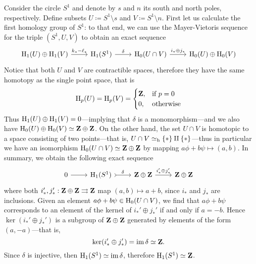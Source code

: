 \begin{example}
    \label{exp:homology-of-the-circle}
    Consider the circle \(S^1\) and denote by \(s\) and \(n\) its south and north
    poles, respectively. Define subsets \(U \coloneq S^1 \setminus s\) and
    \(V \coloneq S^1 \setminus n\). First let us calculate the first homology group of
    \(S^1\): to that end, we can use the Mayer-Vietoris sequence for the triple
    \((S^1, U, V)\) to obtain an exact sequence
    \[
        \begin{tikzcd}
            \Hmlg_1(U) \oplus \Hmlg_1(V) \ar[r, "k_{*} - \ell_{*}"]
            &\Hmlg_1(S^1) \ar[r, "\delta"]
            &\Hmlg_0(U \cap V) \ar[r, "i_{*} \oplus j_{*}"]
            &\Hmlg_0(U) \oplus \Hmlg_0(V)
        \end{tikzcd}
    \]
    Notice that both \(U\) and \(V\) are contractible spaces, therefore they have
    the same homotopy as the single point space, that is
    \[
        \operatorname{H}_p(U) = \operatorname{H}_p(V) =
        \begin{cases}
            \mathbf{Z}, & \text{if } p = 0 \\
            0,  & \text{otherwise}
        \end{cases}
    \]
    Thus \(\operatorname{H}_1(U) \oplus \operatorname{H}_1(V) = 0\)---implying that \(\delta\) is a monomorphism---and
    we also have \(\operatorname{H}_0(U) \oplus \operatorname{H}_0(V) \simeq \mathbf{Z} \oplus \mathbf{Z}\). On the other hand, the
    set \(U \cap V\) is homotopic to a space consisting of two points---that is,
    \(U \cap V \simeq_{\text{h}} \{*\} \amalg \{*\}\)---thus in particular we have an isomorphism
    \(\operatorname{H}_0(U \cap V) \simeq \mathbf{Z} \oplus \mathbf{Z}\) by mapping
    \(a \phi + b \psi \mapsto (a, b)\). In summary, we obtain the following exact
    sequence
    \[
        \begin{tikzcd}
            0 \ar[r]
            &\Hmlg_1(S^1) \ar[r, "\delta", tail]
            &\Z \oplus \Z \ar[r, "i_{*}' \oplus j_{*}'"]
            &\Z \oplus \Z
        \end{tikzcd}
    \]
    where both \(i_{*}', j_{*}': \mathbf{Z} \oplus \mathbf{Z} \rightrightarrows \mathbf{Z}\) map
    \((a, b) \mapsto a + b\), since \(i_{*}\) and \(j_{*}\) are inclusions.  Given an
    element \(a \phi + b \psi \in \operatorname{H}_0(U \cap V)\), we find that
    \(a \phi + b \psi\) corresponds to an element of the kernel of
    \(i_{*}' \oplus j_{*}'\) if and only if \(a = -b\). Hence
    \(\ker(i_*' \oplus j_{*}')\) is a subgroup of \(\mathbf{Z} \oplus \mathbf{Z}\) generated by
    elements of the form \((a, -a)\)---that is,
    \[
        \ker(i_{*}' \oplus j_{*}') = \operatorname{im} \delta \simeq \mathbf{Z}.
    \]
    Since \(\delta\) is injective, then \(\operatorname{H}_1(S^1) \simeq \operatorname{im} \delta\), therefore
    \(\operatorname{H}_1(S^1) \simeq \mathbf{Z}\).


\end{example}
